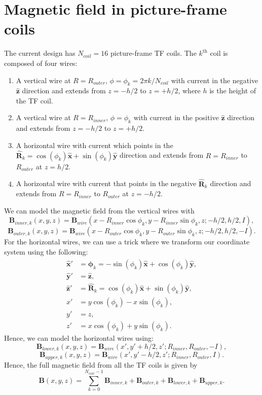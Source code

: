 \documentclass{article}
\begin{document}
\section{Magnetic field in picture-frame coils}

The current design has $N_{coil}=16$ picture-frame TF coils. The $k^{\text{th}}$ coil is composed of four wires:
\begin{enumerate}
    \item A vertical wire at $R=R_{outer}$, $\phi=\phi_k=2\pi k/N_{coil}$ with current in the negative $\mathbf{\hat{z}}$ direction and extends from $z=-h/2$ to $z=+h/2$, where $h$ is the height of the TF coil.
    \item  A vertical wire at $R=R_{inner}$, $\phi=\phi_k$ with current in the positive $\mathbf{\hat{z}}$ direction and extends from $z=-h/2$ to $z=+h/2$.
    \item A horizontal wire with current which points in the $\mathbf{\hat{R}}_k = \cos(\phi_k)\mathbf{\hat{x}}+\sin(\phi_k)\mathbf{\hat{y}}$ direction and extends from $R=R_{inner}$ to $R_{outer}$ at $z=h/2$.
    \item A horizontal wire with current that points in the negative $\mathbf{\hat{R}}_k$ direction and extends from $R=R_{inner}$ to $R_{outer}$ at $z=-h/2$.
\end{enumerate}
We can model the magnetic field from the vertical wires with 
\[\mathbf{B}_{inner,k}(x,y,z) = \mathbf{B}_{wire}(x-R_{inner}\cos\phi_k, y-R_{inner}\sin{\phi_k}, z; -h/2, h/2, I),\]
\[\mathbf{B}_{outer,k}(x,y,z) = \mathbf{B}_{wire}(x-R_{outer}\cos\phi_k, y-R_{outer}\sin{\phi_k}, z; -h/2, h/2, -I).\]
For the horizontal wires, we can use a trick where we transform our coordinate system using the following:
\[\begin{aligned}
\mathbf{\hat{x}}' &= \mathbf{\hat{\phi}}_k = -\sin(\phi_k)\mathbf{\hat{x}}+\cos(\phi_k)\mathbf{\hat{y}}, \\
\mathbf{\hat{y}}' &= \mathbf{\hat{z}}, \\
\mathbf{\hat{z}}' &= \mathbf{\hat{R}}_k=\cos(\phi_k)\mathbf{\hat{x}} + \sin(\phi_k)\mathbf{\hat{y}}, \\
x' &= y\cos(\phi_k) - x\sin(\phi_k), \\
y' &= z, \\
z' &= x\cos(\phi_k) + y\sin(\phi_k).
\end{aligned}\]
Hence, we can model the horizontal wires using:
\[\mathbf{B}_{lower,k}(x,y,z) = \mathbf{B}_{wire}(x', y'+h/2, z'; R_{inner}, R_{outer}, -I),\]
\[\mathbf{B}_{upper,k}(x,y,z) = \mathbf{B}_{wire}(x', y'-h/2, z'; R_{inner}, R_{outer}, I).\]
Hence, the full magnetic field from all the TF coils is given by
\[\boxed{\mathbf{B}(x, y, z) = \sum_{k=0}^{N_{coil}-1}\mathbf{B}_{inner,k} + \mathbf{B}_{outer,k} + \mathbf{B}_{lower,k} + \mathbf{B}_{upper,k}.}\]
\end{document}
